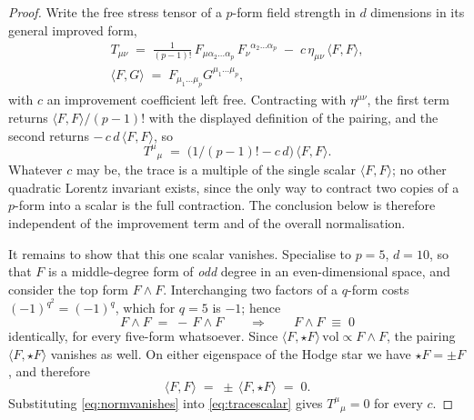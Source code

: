 \documentclass[11pt,a4paper]{article}
\theoremstyle{definition}
\theoremstyle{remark}
\begin{document}
\begin{proof}
Write the free stress tensor of a $p$-form field strength in $d$ dimensions in
its general improved form,
\begin{equation}
\begin{gathered}
T_{\mu\nu}
 \;=\; \frac{1}{(p-1)!}\,F_{\mu\alpha_2\dots\alpha_p}\,
        F_\nu{}^{\alpha_2\dots\alpha_p}
 \;-\; c\,\eta_{\mu\nu}\,\langle F,F\rangle,
\\[2pt]
\langle F,G\rangle \;=\; F_{\mu_1\dots\mu_p}G^{\mu_1\dots\mu_p},
\end{gathered}
\label{eq:stresstensor}
\end{equation}
with $c$ an improvement coefficient left free. Contracting with $\eta^{\mu\nu}$,
the first term returns $\langle F,F\rangle/(p-1)!$ with the displayed
definition of the pairing, and the second returns $-\,c\,d\,\langle F,F\rangle$, so
\begin{equation}
T^{\mu}{}_{\mu} \;=\; \bigl(1/(p-1)! - c\,d\bigr)\,\langle F,F\rangle .
\label{eq:tracescalar}
\end{equation}
Whatever $c$ may be, the trace is a multiple of the single scalar
$\langle F,F\rangle$; no other quadratic Lorentz invariant exists, since the only
way to contract two copies of a $p$-form into a scalar is the full contraction.
The conclusion below is therefore independent of the improvement term and of the
overall normalisation.

It remains to show that this one scalar vanishes. Specialise to $p = 5$, $d = 10$,
so that $F$ is a middle-degree form of \emph{odd} degree in an even-dimensional
space, and consider the top form $F\wedge F$. Interchanging two factors of a
$q$-form costs $(-1)^{q^2} = (-1)^{q}$, which for $q = 5$ is $-1$; hence
\begin{equation}
F\wedge F \;=\; -\,F\wedge F
\qquad\Longrightarrow\qquad
F\wedge F \;\equiv\; 0
\label{eq:wedgevanishes}
\end{equation}
identically, for every five-form whatsoever. Since
$\langle F,\star F\rangle\,\mathrm{vol} \propto F\wedge F$, the pairing
$\langle F,\star F\rangle$ vanishes as well. On either eigenspace of the Hodge
star we have $\star F = \pm F$, and therefore
\begin{equation}
\langle F,F\rangle
 \;=\; \pm\,\langle F,\star F\rangle
 \;=\; 0 .
\label{eq:normvanishes}
\end{equation}
Substituting \eqref{eq:normvanishes} into \eqref{eq:tracescalar} gives
$T^{\mu}{}_{\mu} = 0$ for every $c$.
\end{proof}
\end{document}
